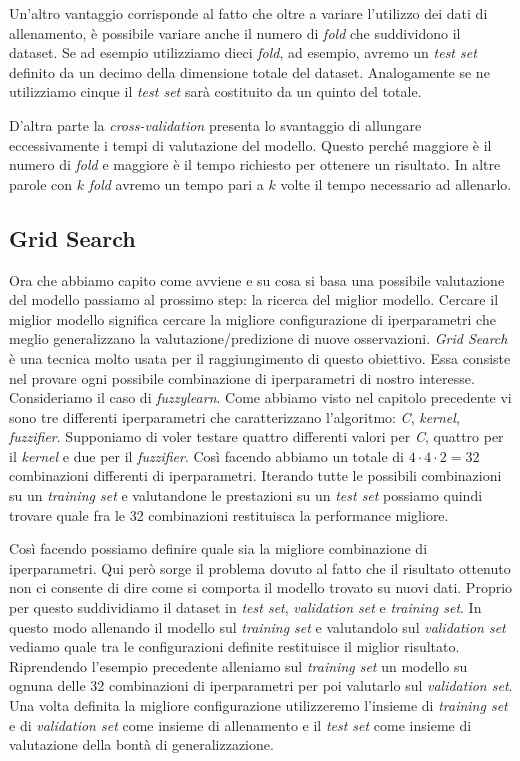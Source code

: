 \documentclass[12pt,italian]{report}
\begin{document}
Un'altro vantaggio corrisponde al fatto che oltre a variare l'utilizzo dei dati di allenamento, è possibile variare anche il numero di \emph{fold} che suddividono il dataset. Se ad esempio utilizziamo dieci \emph{fold}, ad esempio, avremo un \emph{test set} definito da un decimo della dimensione totale del dataset. Analogamente se ne utilizziamo cinque il \emph{test set} sarà costituito da un quinto del totale.

D'altra parte la \emph{cross-validation} presenta lo svantaggio di allungare eccessivamente i tempi di valutazione del modello. Questo perché maggiore è il numero di \emph{fold} e maggiore è il tempo richiesto per ottenere un risultato. In altre parole con $k$ \emph{fold} avremo un tempo pari a $k$ volte il tempo necessario ad allenarlo.

\subsection{Grid Search}
Ora che abbiamo capito come avviene e su cosa si basa una possibile valutazione del modello passiamo al prossimo step: la ricerca del miglior modello.
Cercare il miglior modello significa cercare la migliore configurazione di iperparametri che meglio generalizzano la valutazione/predizione di nuove osservazioni. 
\emph{Grid Search} è una tecnica molto usata per il raggiungimento di questo obiettivo. Essa consiste nel provare ogni possibile combinazione di iperparametri di nostro interesse. Consideriamo il caso di \emph{fuzzylearn}. Come abbiamo visto nel capitolo precedente vi sono tre differenti iperparametri che caratterizzano l'algoritmo: \emph{C}, \emph{kernel}, \emph{fuzzifier}. Supponiamo di voler testare quattro differenti valori per \emph{C}, quattro per il \emph{kernel} e due per il \emph{fuzzifier}. Così facendo abbiamo un totale di $4 \cdot 4 \cdot2 = 32$ combinazioni differenti di iperparametri.
Iterando tutte le possibili combinazioni su un \emph{training set} e valutandone le prestazioni su un \emph{test set} possiamo quindi trovare quale fra le 32 combinazioni restituisca la performance migliore.

Così facendo possiamo definire quale sia la migliore combinazione di iperparametri. Qui però sorge il problema dovuto al fatto che il risultato ottenuto non ci consente di dire come si comporta il modello trovato su nuovi dati. Proprio per questo suddividiamo il dataset in \emph{test set}, \emph{validation set} e \emph{training set}. In questo modo allenando il modello sul \emph{training set} e valutandolo sul \emph{validation set} vediamo quale tra le configurazioni definite restituisce il miglior risultato. Riprendendo l'esempio precedente alleniamo sul \emph{training set} un modello su ognuna delle 32 combinazioni di iperparametri per poi valutarlo sul \emph{validation set}. Una volta definita la migliore configurazione utilizzeremo l'insieme di \emph{training set} e di \emph{validation set} come insieme di allenamento e il \emph{test set} come insieme di valutazione della bontà di generalizzazione.
\end{document}
